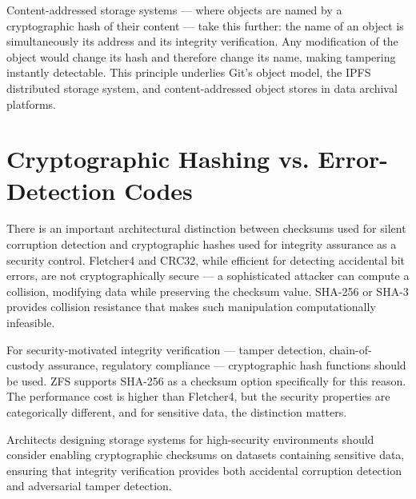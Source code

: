 Content-addressed storage systems --- where objects are named by a cryptographic hash of their content --- take this further: the name of an object is simultaneously its address and its integrity verification. Any modification of the object would change its hash and therefore change its name, making tampering instantly detectable. This principle underlies Git's object model, the IPFS distributed storage system, and content-addressed object stores in data archival platforms.

\section{Cryptographic Hashing vs. Error-Detection Codes}
There is an important architectural distinction between checksums used for silent corruption detection and cryptographic hashes used for integrity assurance as a security control. Fletcher4 and CRC32, while efficient for detecting accidental bit errors, are not cryptographically secure --- a sophisticated attacker can compute a collision, modifying data while preserving the checksum value. SHA-256 or SHA-3 provides collision resistance that makes such manipulation computationally infeasible.

For security-motivated integrity verification --- tamper detection, chain-of-custody assurance, regulatory compliance --- cryptographic hash functions should be used. ZFS supports SHA-256 as a checksum option specifically for this reason. The performance cost is higher than Fletcher4, but the security properties are categorically different, and for sensitive data, the distinction matters.

Architects designing storage systems for high-security environments should consider enabling cryptographic checksums on datasets containing sensitive data, ensuring that integrity verification provides both accidental corruption detection and adversarial tamper detection.

